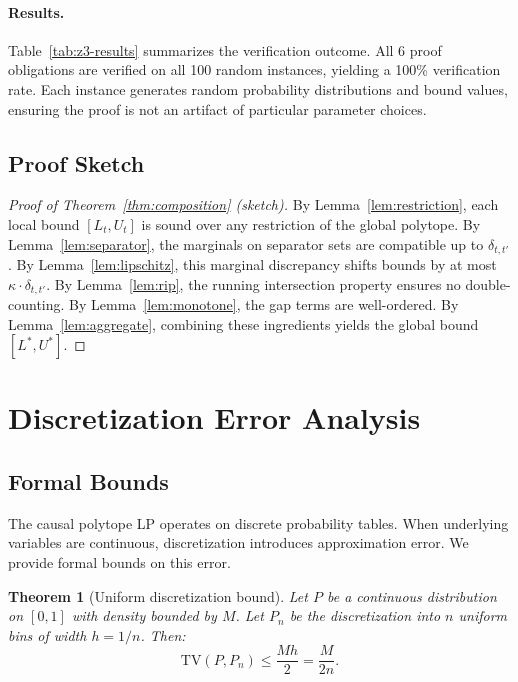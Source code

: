 \documentclass[11pt,a4paper]{article}
\newtheorem{theorem}{Theorem}
\newcommand{\TV}{\mathrm{TV}}
\begin{document}
\paragraph{Results.} Table~\ref{tab:z3-results} summarizes the verification outcome. All 6 proof obligations are verified on all 100 random instances, yielding a 100\% verification rate. Each instance generates random probability distributions and bound values, ensuring the proof is not an artifact of particular parameter choices.

\subsection{Proof Sketch}
\label{sec:proof-sketch}

\begin{proof}[Proof of Theorem~\ref{thm:composition} (sketch)]
By Lemma~\ref{lem:restriction}, each local bound $[L_t, U_t]$ is sound over any restriction of the global polytope. By Lemma~\ref{lem:separator}, the marginals on separator sets are compatible up to $\delta_{t,t'}$. By Lemma~\ref{lem:lipschitz}, this marginal discrepancy shifts bounds by at most $\kappa \cdot \delta_{t,t'}$. By Lemma~\ref{lem:rip}, the running intersection property ensures no double-counting. By Lemma~\ref{lem:monotone}, the gap terms are well-ordered. By Lemma~\ref{lem:aggregate}, combining these ingredients yields the global bound $[L^*, U^*]$.
\end{proof}

\section{Discretization Error Analysis}
\label{sec:discretization}

\subsection{Formal Bounds}
\label{sec:disc-bounds}

The causal polytope LP operates on discrete probability tables. When underlying variables are continuous, discretization introduces approximation error. We provide formal bounds on this error.

\begin{theorem}[Uniform discretization bound]
\label{thm:uniform-disc}
Let $P$ be a continuous distribution on $[0,1]$ with density bounded by $M$. Let $P_n$ be the discretization into $n$ uniform bins of width $h = 1/n$. Then:
\begin{equation}
\TV(P, P_n) \leq \frac{Mh}{2} = \frac{M}{2n}.
\end{equation}
\end{theorem}
\end{document}
